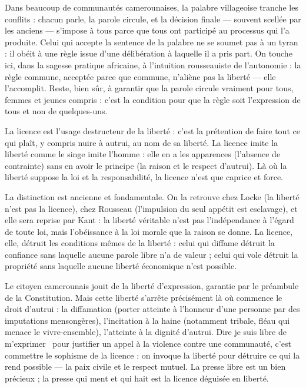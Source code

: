 \documentclass[11pt]{article}
\newcommand{\cle}[1]{{\popxbold\color{popdark}#1}}
\newcounter{popsec}
\newcounter{popsub}
\newcommand{\courssub}[1]{%
  \stepcounter{popsub}%
  \par\vspace{9pt}\noindent{\popxbold\fontsize{11.5}{13}\selectfont\color{popink}{\color{poporange}\thepopsec.\thepopsub}\hspace{6pt}#1}\par\nopagebreak\vspace{4pt}
}
\begin{document}
\begin{exemplebox}
Dans beaucoup de communautés camerounaises, la palabre villageoise tranche les conflits : chacun parle, la parole circule, et la décision finale — souvent scellée par les anciens — s'impose à tous parce que tous ont participé au processus qui l'a produite. Celui qui accepte la sentence de la palabre ne se soumet pas à un tyran : il obéit à une règle issue d'une délibération à laquelle il a pris part. On touche ici, dans la sagesse pratique africaine, à l'intuition rousseauiste de l'autonomie : la règle commune, acceptée parce que commune, n'aliène pas la liberté — elle l'accomplit. Reste, bien sûr, à garantir que la parole circule vraiment pour tous, femmes et jeunes compris : c'est la condition pour que la règle soit l'expression de tous et non de quelques-uns.
\end{exemplebox}

\courssub{Liberté et licence : ne pas confondre la force et le droit}

\begin{definition}[La licence]
La \cle{licence} est l'usage destructeur de la liberté : c'est la prétention de faire tout ce qui plaît, y compris nuire à autrui, au nom de sa liberté. La licence imite la liberté comme le singe imite l'homme : elle en a les apparences (l'absence de contrainte) sans en avoir le principe (la raison et le respect d'autrui). Là où la liberté suppose la loi et la responsabilité, la licence n'est que caprice et force.
\end{definition}

La distinction est ancienne et fondamentale. On la retrouve chez Locke (la liberté n'est pas la licence), chez Rousseau (l'impulsion du seul appétit est esclavage), et elle sera reprise par Kant : la liberté véritable n'est pas l'indépendance à l'égard de toute loi, mais l'obéissance à la loi morale que la raison se donne. La licence, elle, détruit les conditions mêmes de la liberté : celui qui diffame détruit la confiance sans laquelle aucune parole libre n'a de valeur ; celui qui vole détruit la propriété sans laquelle aucune liberté économique n'est possible.

\begin{exemplebox}
Le citoyen camerounais jouit de la liberté d'expression, garantie par le préambule de la Constitution. Mais cette liberté s'arrête précisément là où commence le droit d'autrui : la \cle{diffamation} (porter atteinte à l'honneur d'une personne par des imputations mensongères), l'\cle{incitation à la haine} (notamment tribale, fléau qui menace le vivre-ensemble), l'atteinte à la dignité d'autrui. Dire \guillemotleft je suis libre de m'exprimer \guillemotright\ pour justifier un appel à la violence contre une communauté, c'est commettre le sophisme de la licence : on invoque la liberté pour détruire ce qui la rend possible — la paix civile et le respect mutuel. La presse libre est un bien précieux ; la presse qui ment et qui hait est la licence déguisée en liberté.
\end{exemplebox}
\end{document}
